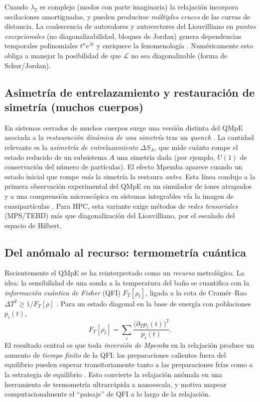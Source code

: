\documentclass[11pt,a4paper]{article}
\theoremstyle{definition}
\theoremstyle{plain}
\newcommand{\Lop}{\mathcal{L}}
\begin{document}
Cuando $\lambda_2$ es complejo (modos con parte imaginaria) la relajación incorpora oscilaciones
amortiguadas, y pueden producirse \emph{múltiples cruces} de las curvas de distancia. La coalescencia de
autovalores y autovectores del Liouvilliano en \emph{puntos excepcionales} (no diagonalizabilidad,
bloques de Jordan) genera dependencias temporales polinomiales $t^{n}e^{\lambda t}$ y enriquece la
fenomenología \cite{Chatterjee2024,Minganti2018}. Numéricamente esto obliga a manejar la posibilidad de que
$\Lop$ no sea diagonalizable (forma de Schur/Jordan).

\subsection{Asimetría de entrelazamiento y restauración de simetría (muchos cuerpos)}

En sistemas cerrados de muchos cuerpos surge una versión distinta del QMpE asociada a la \emph{restauración
dinámica de una simetría} tras un \emph{quench} \cite{AresCalabreseMurciano2025,Murciano2024,Rylands2024,Liu2024,Joshi2024}.
La cantidad relevante es la \emph{asimetría de entrelazamiento} $\Delta S_A$, que mide cuánto rompe el estado
reducido de un subsistema $A$ una simetría dada (por ejemplo, $U(1)$ de conservación del número de
partículas). El efecto Mpemba aparece cuando un estado inicial que rompe \emph{más} la simetría la
restaura \emph{antes}. Esta línea condujo a la primera observación experimental del QMpE en un simulador de
iones atrapados \cite{Joshi2024} y a una comprensión microscópica en sistemas integrables vía la imagen de
cuasipartículas \cite{Rylands2024}. Para HPC, esta variante exige métodos de \emph{redes tensoriales}
(MPS/TEBD) más que diagonalización del Liouvilliano, por el escalado del espacio de Hilbert.

\subsection{Del anómalo al recurso: termometría cuántica}

Recientemente el QMpE se ha reinterpretado como un \emph{recurso} metrológico. La idea: la sensibilidad de
una sonda a la temperatura del baño se cuantifica con la \emph{información cuántica de Fisher} (QFI)
$F_T[\rho_t]$, ligada a la cota de Cramér--Rao $\Delta T^2 \ge 1/F_T[\rho]$ \cite{Chattopadhyay2026,LiYang2026}.
Para un estado diagonal en la base de energía con poblaciones $p_i(t)$,
\begin{equation}
F_T[\rho_t]=\sum_i \frac{\big(\partial_T p_i(t)\big)^2}{p_i(t)} .
\label{eq:qfi}
\end{equation}
El resultado central es que toda \emph{inversión de Mpemba} en la relajación produce un aumento de
\emph{tiempo finito} de la QFI: las preparaciones calientes fuera del equilibrio pueden superar
transitoriamente tanto a las preparaciones frías como a la estrategia de equilibrio
\cite{Chattopadhyay2026,LiYang2026}. Esto convierte la relajación anómala en una herramienta de termometría
ultrarrápida a nanoescala, y motiva mapear computacionalmente el ``paisaje'' de QFI a lo largo de la
relajación.
\end{document}
